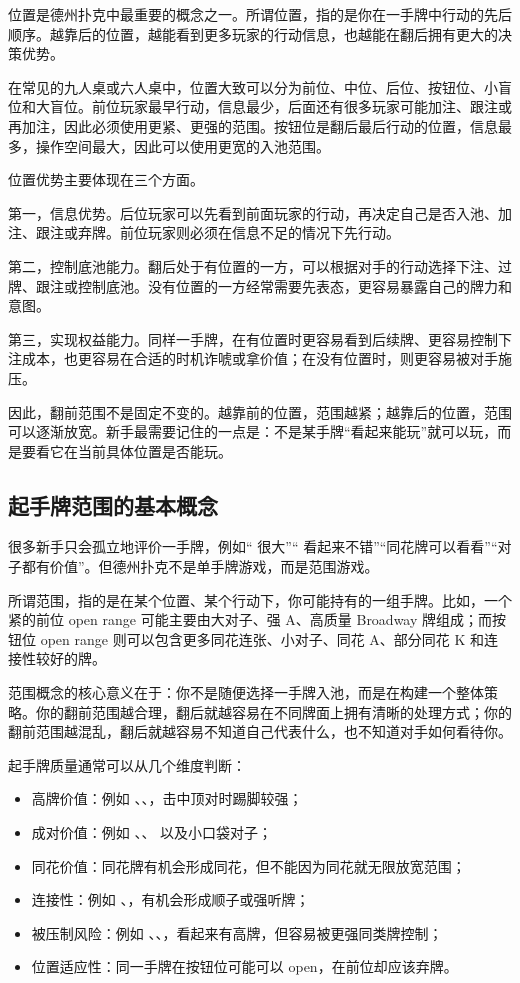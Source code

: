 位置是德州扑克中最重要的概念之一。所谓位置，指的是你在一手牌中行动的先后顺序。越靠后的位置，越能看到更多玩家的行动信息，也越能在翻后拥有更大的决策优势。

在常见的九人桌或六人桌中，位置大致可以分为前位、中位、后位、按钮位、小盲位和大盲位。前位玩家最早行动，信息最少，后面还有很多玩家可能加注、跟注或再加注，因此必须使用更紧、更强的范围。按钮位是翻后最后行动的位置，信息最多，操作空间最大，因此可以使用更宽的入池范围。

位置优势主要体现在三个方面。

第一，信息优势。后位玩家可以先看到前面玩家的行动，再决定自己是否入池、加注、跟注或弃牌。前位玩家则必须在信息不足的情况下先行动。

第二，控制底池能力。翻后处于有位置的一方，可以根据对手的行动选择下注、过牌、跟注或控制底池。没有位置的一方经常需要先表态，更容易暴露自己的牌力和意图。

第三，实现权益能力。同样一手牌，在有位置时更容易看到后续牌、更容易控制下注成本，也更容易在合适的时机诈唬或拿价值；在没有位置时，则更容易被对手施压。

因此，翻前范围不是固定不变的。越靠前的位置，范围越紧；越靠后的位置，范围可以逐渐放宽。新手最需要记住的一点是：不是某手牌“看起来能玩”就可以玩，而是要看它在当前具体位置是否能玩。

\subsection{起手牌范围的基本概念}

很多新手只会孤立地评价一手牌，例如“ 很大”“ 看起来不错”“同花牌可以看看”“对子都有价值”。但德州扑克不是单手牌游戏，而是范围游戏。

所谓范围，指的是在某个位置、某个行动下，你可能持有的一组手牌。比如，一个紧的前位 open range 可能主要由大对子、强 A、高质量 Broadway 牌组成；而按钮位 open range 则可以包含更多同花连张、小对子、同花 A、部分同花 K 和连接性较好的牌。

范围概念的核心意义在于：你不是随便选择一手牌入池，而是在构建一个整体策略。你的翻前范围越合理，翻后就越容易在不同牌面上拥有清晰的处理方式；你的翻前范围越混乱，翻后就越容易不知道自己代表什么，也不知道对手如何看待你。

起手牌质量通常可以从几个维度判断：

\begin{itemize}
\item 高牌价值：例如 、、，击中顶对时踢脚较强；
\item 成对价值：例如 、、 以及小口袋对子；
\item 同花价值：同花牌有机会形成同花，但不能因为同花就无限放宽范围；
\item 连接性：例如 、，有机会形成顺子或强听牌；
\item 被压制风险：例如 、、，看起来有高牌，但容易被更强同类牌控制；
\item 位置适应性：同一手牌在按钮位可能可以 open，在前位却应该弃牌。
\end{itemize}

